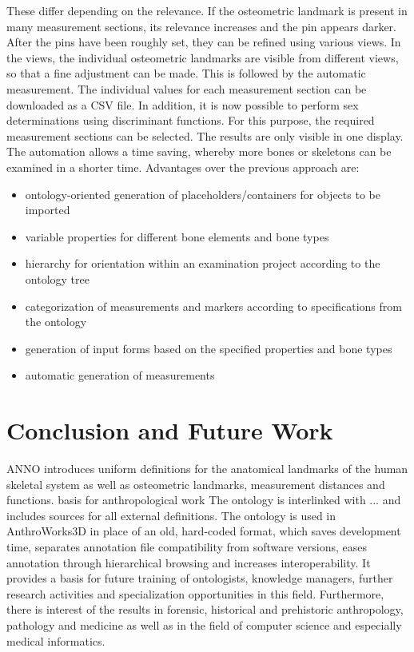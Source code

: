 \documentclass[sw]{iosart2x}
\newcommand{\aw}{AnthroWorks3D}
\begin{document}
These differ depending on the relevance.
If the osteometric landmark is present in many measurement sections, its relevance increases and the pin appears darker.
After the pins have been roughly set, they can be refined using various views.
In the views, the individual osteometric landmarks are visible from different views, so that a fine adjustment can be made.
This is followed by the automatic measurement.
The individual values for each measurement section can be downloaded as a CSV file.
In addition, it is now possible to perform sex determinations using discriminant functions.
For this purpose, the required measurement sections can be selected.
The results are only visible in one display.
The automation allows a time saving, whereby more bones or skeletons can be examined in a shorter time.
Advantages over the previous approach are:

\begin{itemize}
\item ontology-oriented generation of placeholders/containers for objects to be imported
\item variable properties for different bone elements and bone types
\item hierarchy for orientation within an examination project according to the ontology tree
\item categorization of measurements and markers according to specifications from the ontology
\item generation of input forms based on the specified properties and bone types
\item automatic generation of measurements
\end{itemize}


\section{Conclusion and Future Work}

ANNO introduces uniform definitions for the anatomical landmarks of the human skeletal system as well as osteometric landmarks, measurement distances and functions.
basis for anthropological work
The ontology is interlinked with ... and includes sources for all external definitions.
The ontology is used in \aw{} in place of an old, hard-coded format, which saves development time, separates annotation file compatibility from software versions, eases annotation through hierarchical browsing and increases interoperability.
It provides a basis for future training of ontologists, knowledge managers, further research activities and specialization opportunities in this field.
Furthermore, there is interest of the results in forensic, historical and prehistoric anthropology, pathology and medicine as well as in the field of computer science and especially medical informatics.
\end{document}
